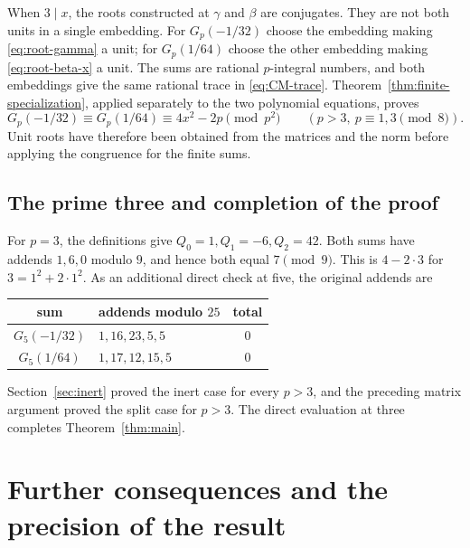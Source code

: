 \documentclass[11pt,a4paper]{article}
\theoremstyle{remark}
\begin{document}
When $3\mid x$, the roots constructed at $\gamma$ and $\beta$
are conjugates. They are not both units in a single embedding.
For $G_p(-1/32)$ choose the embedding making \eqref{eq:root-gamma}
a unit; for $G_p(1/64)$ choose the other embedding making
\eqref{eq:root-beta-x} a unit.
The sums are rational $p$-integral numbers, and both embeddings
give the same rational trace in \eqref{eq:CM-trace}.
Theorem~\ref{thm:finite-specialization}, applied separately to the
two polynomial equations, proves
\[
 G_p(-1/32)\equiv G_p(1/64)\equiv4x^2-2p\pmod{p^2}
 \qquad(p>3,\ p\equiv1,3\pmod8).
\]
Unit roots have therefore been obtained from the matrices and the
norm before applying the congruence for the finite sums.

\subsection{The prime three and completion of the proof}
For $p=3$, the definitions give $Q_0=1,Q_1=-6,Q_2=42$.
Both sums have addends $1,6,0$ modulo $9$, and hence both equal
$7\pmod9$. This is $4-2\cdot3$ for $3=1^2+2\cdot1^2$.
As an additional direct check at five, the original addends are
\begin{center}
\begin{tabular}{c l c}
\toprule
sum & addends modulo $25$ & total\\
\midrule
$G_5(-1/32)$ & $1,16,23,5,5$ & $0$\\
$G_5(1/64)$ & $1,17,12,15,5$ & $0$\\
\bottomrule
\end{tabular}
\end{center}
Section~\ref{sec:inert} proved the inert case for every $p>3$,
and the preceding matrix argument proved the split case for $p>3$.
The direct evaluation at three completes Theorem~\ref{thm:main}.

\section{Further consequences and the precision of the result}
\label{sec:consequences}
\end{document}
